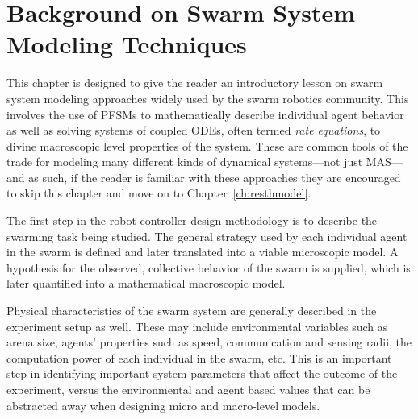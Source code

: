 \documentclass[defaultstyle,12pt]{thesis}
\begin{document}
\chapter{Background on Swarm System Modeling Techniques}\label{ch:background}
This chapter is designed to give the reader an introductory lesson on swarm system modeling approaches widely used by the swarm robotics community. This involves the use of PFSMs to mathematically describe individual agent behavior as well as solving systems of coupled ODEs, often termed \emph{rate equations}, to divine macroscopic level properties of the system. These are common tools of the trade for modeling many different kinds of dynamical systems---not just MAS---and as such, if the reader is familiar with these approaches they are encouraged to skip this chapter and move on to Chapter~\ref{ch:resthmodel}.

The first step in the robot controller design methodology is to describe the swarming task being studied. The general strategy used by each individual agent in the swarm is defined and later translated into a viable microscopic model. A hypothesis for the observed, collective behavior of the swarm is supplied, which is later quantified into a mathematical macroscopic model.

Physical characteristics of the swarm system are generally described in the experiment setup as well. These may include environmental variables such as arena size, agents' properties such as speed, communication and sensing radii, the computation power of each individual in the swarm, etc. This is an important step in identifying important system parameters that affect the outcome of the experiment, versus the environmental and agent based values that can be abstracted away when designing micro and macro-level models.
 
\end{document}

